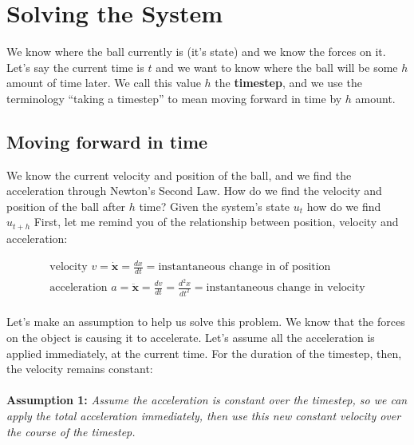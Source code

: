 \documentclass[]{article}
\begin{document}
\pagebreak

\section{Solving the System}

We know where the ball currently is (it's state) and we know the forces on it. Let's say the current time is $t$ and we want to know where the ball will be some $h$ amount of time later. We call this value $h$ the \textbf{timestep}, and we use the terminology ``taking a timestep'' to mean moving forward in time by $h$ amount. 

\subsection{Moving forward in time}

We know the current velocity and position of the ball, and we find the acceleration through Newton's Second Law. How do we find the velocity and position of the ball after $h$ time? Given the system's state $u_t$ how do we find $u_{t+h}$ First, let me remind you of the relationship between position, velocity and acceleration:

\begin{eqnarray}
	\text{velocity } v = \mathbf{\dot{x}} = \frac{dx}{dt} = \text{instantaneous change in of position}\\
	\text{acceleration } a = \mathbf{\ddot{x}} = \frac{dv}{dt} = \frac{d^2x}{dt^2} = \text{instantaneous change in velocity}
\end{eqnarray}

\paragraph{}

Let's make an assumption to help us solve this problem. We know that the forces on the object is causing it to accelerate. Let's assume all the acceleration is applied immediately, at the current time. For the duration of the timestep, then, the velocity remains constant:

\paragraph{}

\textbf{Assumption 1:} \emph{Assume the acceleration is constant over the timestep, so we can apply the total acceleration immediately, then use this new constant velocity over the course of the timestep.}
\end{document}
